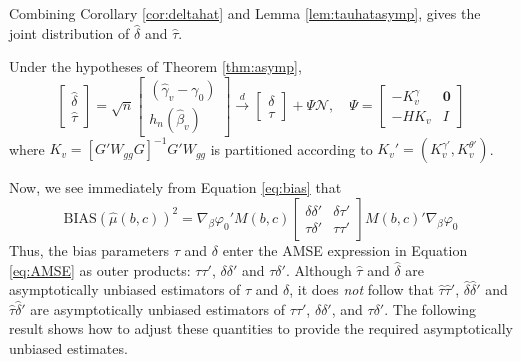 Combining Corollary \ref{cor:deltahat} and Lemma \ref{lem:tauhatasymp}, gives the joint distribution of $\widehat{\delta}$ and $\widehat{\tau}$.

\begin{thm}
\label{thm:jointbias}
Under the hypotheses of Theorem \ref{thm:asymp},
	\[\left[\begin{array}{c}\widehat{\delta}\\ \widehat{\tau}\end{array}\right] = \sqrt{n}\left[\begin{array}{c}\left(\widehat{\gamma}_v-\gamma_0\right)\\h_n(\widehat{\beta}_v)\end{array}\right]
  \overset{d}{\rightarrow} \left[\begin{array}{c}\delta\\ \tau\end{array} \right] +\Psi \mathscr{N}, \quad
  \Psi = \left[\begin{array}{cc} -K_{v}^\gamma&\mathbf{0} \\ -HK_v&I\end{array}\right]
\]
	where $K_v = \left[G'W_{gg}G\right]^{-1}G'W_{gg}$  is partitioned according to $K_v' = (K_v^{\gamma '}, K_v^{\theta '})$.
\end{thm}
Now, we see immediately from Equation \ref{eq:bias} that
$$\mbox{BIAS}\left(\widehat{\mu}\left(b,c\right)\right)^2 = \nabla_\beta \varphi_0' M(b,c) \left[\begin{array}{cc}  \delta \delta'& \delta \tau'\\ \tau \delta'& \tau \tau'\end{array}\right] M(b,c)' \nabla_\beta \varphi_0$$
Thus, the bias parameters $\tau$ and $\delta$ enter the AMSE expression in Equation \ref{eq:AMSE} as outer products: $\tau\tau'$, $\delta\delta'$ and $\tau\delta'$.
Although $\widehat{\tau}$ and $\widehat{\delta}$ are asymptotically unbiased estimators of $\tau$ and $\delta$, it does \emph{not} follow that $\widehat{\tau}\widehat{\tau}'$, $\widehat{\delta}\widehat{\delta}'$ and $\widehat{\tau}\widehat{\delta}'$ are  asymptotically unbiased estimators of $\tau\tau'$, $\delta\delta'$, and $\tau\delta'$. 
The following result shows how to adjust these quantities to provide the required asymptotically unbiased estimates. 


